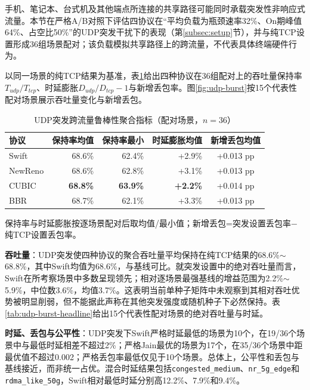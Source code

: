 \documentclass[10pt,twocolumn]{article}
\begin{document}
手机、笔记本、台式机及其他端点所连接的共享路径可能同时承载突发性非响应式流量。本节在严格A/B对照下评估四协议在“平均负载为瓶颈速率32\%、On期峰值64\%、占空比50\%”的UDP突发干扰下的表现（第\ref{subsec:setup}节），并与纯TCP设置形成36组场景配对；该负载模拟共享路径上的跨流量，不代表具体终端硬件行为。

以同一场景的纯TCP结果为基准，表\ref{tab:udp-burst-agg}给出四种协议在36组配对上的吞吐量保持率$T_{udp}/T_{tcp}$、时延膨胀$D_{udp}/D_{tcp}-1$与新增丢包率。图\ref{fig:udp-burst}按15个代表性配对场景展示吞吐量变化与新增丢包。

\begin{table}[htbp]
\centering
\caption{UDP突发跨流量鲁棒性聚合指标（配对场景，$n=36$）}
\label{tab:udp-burst-agg}
\scriptsize
\setlength{\tabcolsep}{3pt}
\begin{tabular}{@{}lrrrc@{}}
\toprule
\textbf{协议} & \textbf{保持率均值} & \textbf{保持率最小} & \textbf{时延膨胀均值} & \textbf{新增丢包均值} \\
\midrule
Swift    & 68.6\% & 62.4\% & +2.9\% & +0.013 pp \\
NewReno & 68.6\% & 62.8\% & +3.1\% & +0.013 pp \\
CUBIC   & \textbf{68.8\%} & \textbf{63.9\%} & \textbf{+2.2\%} & +0.014 pp \\
BBR     & 68.7\% & 62.1\% & +3.3\% & +0.013 pp \\
\bottomrule
\end{tabular}
\vspace{2pt}

\raggedright
\scriptsize 保持率与时延膨胀按逐场景配对后取均值/最小值；新增丢包=突发设置丢包率$-$纯TCP设置丢包率。
\end{table}

\textbf{吞吐量}：UDP突发使四种协议的聚合吞吐量平均保持在纯TCP结果的68.6\%$\sim$68.8\%，其中Swift均值为68.6\%，与基线可比。就突发设置中的绝对吞吐量而言，Swift在所考察场景中多数呈现领先；相对逐场景最强基线的增益范围为2.2\%$\sim$5.9\%，中位数3.6\%，均值3.7\%。这表明当前单种子矩阵中未观察到其相对吞吐优势被明显削弱，但不能据此声称在其他突发强度或随机种子下必然保持。表\ref{tab:udp-burst-headline}给出15个代表性配对场景的绝对吞吐量与时延。

\textbf{时延、丢包与公平性}：UDP突发下Swift严格时延最低的场景为10个，在19/36个场景中与最低时延相差不超过2\%；严格Jain最优的场景为17个，在35/36个场景中距最优值不超过0.002；严格丢包率最低仅见于10个场景。总体上，公平性和丢包与基线接近，而非统一占优。混合时延结果包括\texttt{congested\_medium}、\texttt{nr\_5g\_edge}和\texttt{rdma\_like\_50g}，Swift相对最低时延分别高12.2\%、7.9\%和9.4\%。
\end{document}
